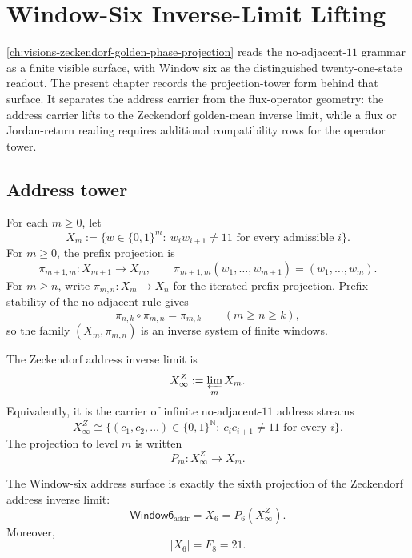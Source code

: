 \chapter{Window-Six Inverse-Limit Lifting}
\label{ch:visions-axiszeckendorf-window-six-inverse-limit-lifting}

\autoref{ch:visions-zeckendorf-golden-phase-projection} reads the
no-adjacent-$11$ grammar as a finite visible surface, with Window six as the
distinguished twenty-one-state readout.  The present chapter records the
projection-tower form behind that surface.  It separates the address carrier
from the flux-operator geometry: the address carrier lifts to the
Zeckendorf golden-mean inverse limit, while a flux or Jordan-return reading
requires additional compatibility rows for the operator tower.

\section{Address tower}
\label{sec:axiszeckendorf-address-tower}

\begin{definition}
\label{def:axiszeckendorf-no-adjacent-address-windows}
For each $m\geq 0$, let
$$
X_m
:=
\{w\in\{0,1\}^m:\ w_iw_{i+1}\neq 11\text{ for every admissible }i\}.
$$
For $m\geq 0$, the prefix projection is
$$
\pi_{m+1,m}:X_{m+1}\to X_m,
\qquad
\pi_{m+1,m}(w_1,\ldots,w_{m+1})=(w_1,\ldots,w_m).
$$
For $m\geq n$, write $\pi_{m,n}:X_m\to X_n$ for the iterated prefix
projection.  Prefix stability of the no-adjacent rule gives
$$
\pi_{n,k}\circ\pi_{m,n}=\pi_{m,k}
\qquad
(m\geq n\geq k),
$$
so the family $(X_m,\pi_{m,n})$ is an inverse system of finite windows.
\end{definition}

\begin{definition}
\label{def:axiszeckendorf-address-inverse-limit}
The Zeckendorf address inverse limit is
$$
X_\infty^Z
:=
\varprojlim_m X_m.
$$
Equivalently, it is the carrier of infinite no-adjacent-$11$ address
streams
$$
X_\infty^Z
\cong
\{(c_1,c_2,\ldots)\in\{0,1\}^{\mathbb N}:\ c_ic_{i+1}\neq 11
\text{ for every }i\}.
$$
The projection to level $m$ is written
$$
P_m:X_\infty^Z\to X_m.
$$
\end{definition}

\begin{proposition}
\label{prop:axiszeckendorf-window-six-address-projection}
The Window-six address surface is exactly the sixth projection of the
Zeckendorf address inverse limit:
$$
\mathsf{Window6}_{\mathrm{addr}}
=
X_6
=
P_6(X_\infty^Z).
$$
Moreover,
$$
|X_6|=F_8=21.
$$
\end{proposition}

